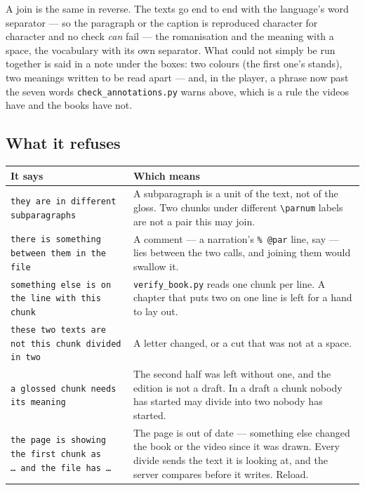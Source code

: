 \documentclass[11pt,oneside]{report}
\newcommand{\file}[1]{\texttt{#1}}
\begin{document}
\noindent A join is the same in reverse. The texts go end to end with the
language's word separator --- so the paragraph or the caption is reproduced
character for character and no check \emph{can} fail --- the romanisation and
the meaning with a space, the vocabulary with its own separator. What could
not simply be run together is said in a note under the boxes: two colours
(the first one's stands), two meanings written to be read apart --- and, in
the player, a phrase now past the seven words \file{check\_annotations.py}
warns above, which is a rule the videos have and the books have not.

\subsection*{What it refuses}

\begin{center}
\begin{tabular}{@{}p{}p{}@{}}
\toprule
\textsf{It says} & \textsf{Which means} \\
\midrule
\texttt{they are in different subparagraphs} & A subparagraph is a unit of the
text, not of the gloss. Two chunks under different \verb|\parnum| labels are not
a pair this may join. \\
\addlinespace
\texttt{there is something between them in the file} & A comment --- a
narration's \texttt{\% @par} line, say --- lies between the two calls, and
joining them would swallow it. \\
\addlinespace
\texttt{something else is on the line with this chunk} & \file{verify\_book.py}
reads one chunk per line. A chapter that puts two on one line is left for a
hand to lay out. \\
\addlinespace
\texttt{these two texts are not this chunk divided in two} & A letter changed,
or a cut that was not at a space. \\
\addlinespace
\texttt{a glossed chunk needs its meaning} & The second half was left without
one, and the edition is not a draft. In a draft a chunk nobody has started may
divide into two nobody has started. \\
\addlinespace
\texttt{the page is showing the first chunk as \ldots\ and the file has \ldots} &
The page is out of date --- something else changed the book or the video since
it was drawn. Every divide sends the text it is looking at, and the server
compares before it writes. Reload. \\
\bottomrule
\end{tabular}
\end{center}
\end{document}
